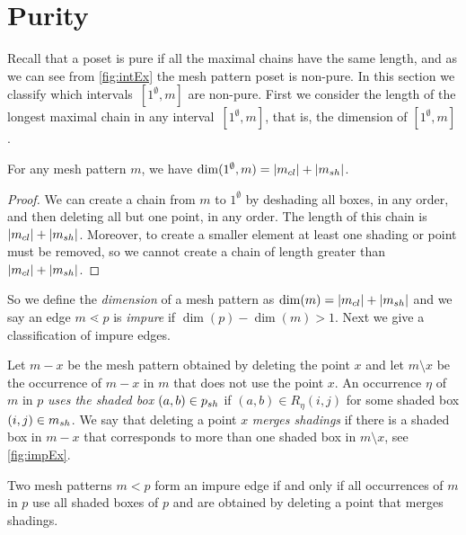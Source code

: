 \documentclass[11pt,a4paper,oneside]{article}
\begin{document}
\section{Purity}\label{sec:purity}
Recall that a poset is pure if all the maximal chains have the same length, and as we
can see from \cref{fig:intEx} the mesh pattern poset is non-pure. In this section we classify
which intervals~$[1^\emptyset,m]$ are non-pure. First we consider the length of the longest maximal chain in
any interval~$[1^\emptyset,m]$, that is, the dimension of $[1^\emptyset,m]$.

\begin{lem}
For any mesh pattern $m$, we have $\dim(1^\emptyset,m)=|m_{cl}|+|m_{sh}|$.
\begin{proof}
We can create a chain from $m$ to $1^\emptyset$ by deshading all boxes, in any order,
and then deleting all but one point, in any order. The length of this chain is $|m_{cl}|+|m_{sh}|$.
Moreover, to create a smaller element at least one shading or point must be removed,
 so we cannot create a chain of length greater than $|m_{cl}|+|m_{sh}|$.
\end{proof}
\end{lem}

So we define the \emph{dimension} of a mesh pattern as $\dim(m)=|m_{cl}|+|m_{sh}|$ and we say an
edge $m\lessdot p$ is \emph{impure} if $\dim(p)-\dim(m)>1$.
Next we give a classification of impure edges.

 Let $m-x$ be the mesh pattern obtained by deleting the
point $x$ and let $m\setminus x$ be the occurrence of $m-x$ in $m$ that does not
use the point $x$. An occurrence $\eta$ of $m$ in $p$ \emph{uses the shaded box $(a,b)\in p_{sh}$}
if $(a,b)\in R_\eta(i,j)$ for some shaded box $(i,j)\in m_{sh}$. We say that
deleting a point $x$ \emph{merges shadings} if
there is a shaded box in $m-x$ that corresponds to more than one shaded box in
$m\setminus x$, see \cref{fig:impEx}.

\begin{lem}\label{lem:impureEdge}
Two mesh patterns $m<p$ form an impure edge if and only if all occurrences of $m$ in
$p$ use all shaded boxes of $p$ and are obtained by deleting a point that merges
shadings.
\end{lem}
\end{document}
